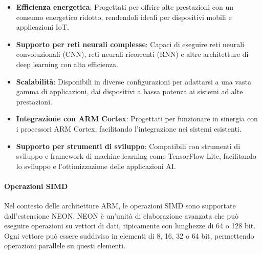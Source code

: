 \documentclass{article}
\begin{document}
\begin{itemize}
  \item \textbf{Efficienza energetica}: Progettati per offrire alte prestazioni con un consumo energetico ridotto, rendendoli ideali per dispositivi mobili e applicazioni IoT.
  \item \textbf{Supporto per reti neurali complesse}: Capaci di eseguire reti neurali convoluzionali (CNN), reti neurali ricorrenti (RNN) e altre architetture di deep learning con alta efficienza.
  \item \textbf{Scalabilità}: Disponibili in diverse configurazioni per adattarsi a una vasta gamma di applicazioni, dai dispositivi a bassa potenza ai sistemi ad alte prestazioni.
  \item \textbf{Integrazione con ARM Cortex}: Progettati per funzionare in sinergia con i processori ARM Cortex, facilitando l'integrazione nei sistemi esistenti.
  \item \textbf{Supporto per strumenti di sviluppo}: Compatibili con strumenti di sviluppo e framework di machine learning come TensorFlow Lite, facilitando lo sviluppo e l'ottimizzazione delle applicazioni AI.
\end{itemize}

\paragraph{Operazioni SIMD}
Nel contesto delle architetture ARM, le operazioni SIMD sono supportate dall'estensione NEON. NEON è un'unità di elaborazione avanzata che può eseguire operazioni su vettori di dati, tipicamente con lunghezze di 64 o 128 bit. Ogni vettore può essere suddiviso in elementi di 8, 16, 32 o 64 bit, permettendo operazioni parallele su questi elementi.
\end{document}
